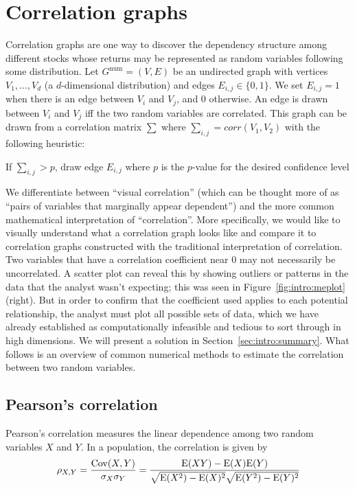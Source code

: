 \section{Correlation graphs}
\label{sec:intro:correlation}

Correlation graphs are one way to discover the dependency structure among
different stocks whose returns may be represented as random variables following
some distribution. Let $G^{\text{num}}=(V,E)$ be an undirected graph with 
vertices
$V_{1},...,V_{d}$ (a $d$-dimensional distribution) and edges
$E_{i,j}\in\{0,1\}$. We set $E_{i,j}=1$ when there is an edge between $V_i$ and
$V_j$, and 0 otherwise. An edge is drawn between $V_i$ and $V_j$ iff the two
random variables are correlated. This graph can be drawn from a correlation
matrix $\sum$ where $\sum_{i,j}=corr(V_1,V_2)$ with the following heuristic:\\

\begin{algorithm}
	If $\sum_{i,j}>p$, draw edge $E_{i,j}$ where $p$ is the $p$-value for the
	desired confidence level
\end{algorithm}

We differentiate between ``visual correlation'' (which can be thought more of as
``pairs of variables that marginally appear dependent'') and the more common
mathematical interpretation of ``correlation''. More specifically, we would like
to visually understand what a correlation graph looks like and compare it to
correlation graphs constructed with the traditional interpretation of
correlation. Two variables that have a correlation coefficient near 0 may not
necessarily be uncorrelated. A scatter plot can reveal this by showing
outliers or patterns in the data that the analyst wasn't expecting; this was 
seen in Figure~\ref{fig:intro:meplot} (right). But in order to confirm that the 
coefficient used applies to each potential relationship, the analyst must plot 
all possible sets of data, which we have already established as computationally 
infeasible and tedious to sort through in high dimensions. We will present a 
solution in Section~\ref{sec:intro:summary}. What follows is an overview of 
common numerical methods to estimate the correlation between two random 
variables.

\subsection{Pearson's correlation}

Pearson's correlation measures the linear dependence among two random variables
$X$ and $Y$. In a population, the correlation is given by
$$\rho_{X,Y}=\frac{\mathrm{Cov}(X,Y)}{\sigma_X \sigma_Y} =
\frac{\mathrm{E}(XY)-\mathrm{E}(X)\mathrm{E}(Y)}{\sqrt{\mathrm{E}(X^2)-\mathrm{E}(X)^2} \sqrt{\mathrm{E}(Y^2)-\mathrm{E}(Y)^2}}$$ 

